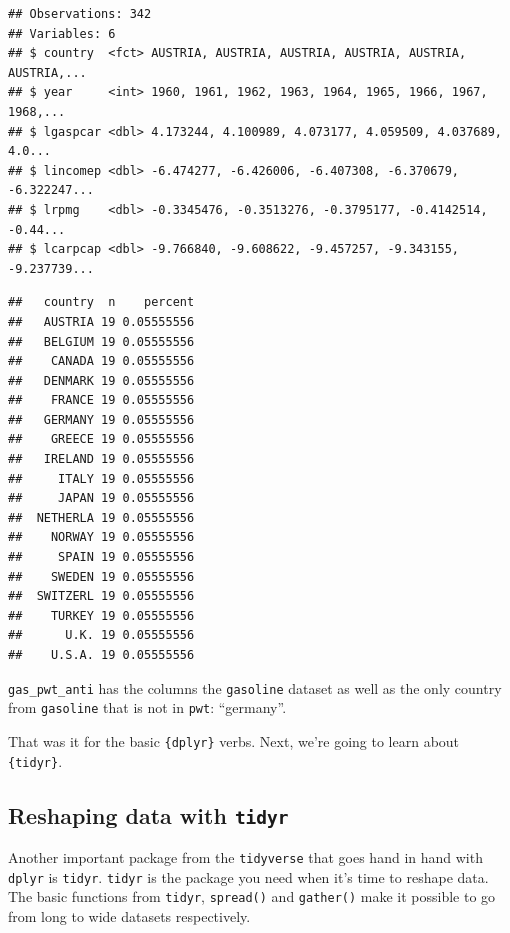 \documentclass[]{gitbook}
\newenvironment{Shaded}{\begin{snugshade}}{\end{snugshade}}
\newcommand{\KeywordTok}[1]{\textcolor[rgb]{0.13,0.29,0.53}{\textbf{#1}}}
\newcommand{\NormalTok}[1]{#1}
\newcommand{\OperatorTok}[1]{\textcolor[rgb]{0.81,0.36,0.00}{\textbf{#1}}}
\newcommand{\StringTok}[1]{\textcolor[rgb]{0.31,0.60,0.02}{#1}}
\theoremstyle{definition}
\theoremstyle{definition}
\theoremstyle{definition}
\theoremstyle{remark}
\begin{document}
\begin{verbatim}
## Observations: 342
## Variables: 6
## $ country  <fct> AUSTRIA, AUSTRIA, AUSTRIA, AUSTRIA, AUSTRIA, AUSTRIA,...
## $ year     <int> 1960, 1961, 1962, 1963, 1964, 1965, 1966, 1967, 1968,...
## $ lgaspcar <dbl> 4.173244, 4.100989, 4.073177, 4.059509, 4.037689, 4.0...
## $ lincomep <dbl> -6.474277, -6.426006, -6.407308, -6.370679, -6.322247...
## $ lrpmg    <dbl> -0.3345476, -0.3513276, -0.3795177, -0.4142514, -0.44...
## $ lcarpcap <dbl> -9.766840, -9.608622, -9.457257, -9.343155, -9.237739...
\end{verbatim}

\begin{Shaded}
\end{Shaded}

\begin{verbatim}
##   country  n    percent
##   AUSTRIA 19 0.05555556
##   BELGIUM 19 0.05555556
##    CANADA 19 0.05555556
##   DENMARK 19 0.05555556
##    FRANCE 19 0.05555556
##   GERMANY 19 0.05555556
##    GREECE 19 0.05555556
##   IRELAND 19 0.05555556
##     ITALY 19 0.05555556
##     JAPAN 19 0.05555556
##  NETHERLA 19 0.05555556
##    NORWAY 19 0.05555556
##     SPAIN 19 0.05555556
##    SWEDEN 19 0.05555556
##  SWITZERL 19 0.05555556
##    TURKEY 19 0.05555556
##      U.K. 19 0.05555556
##    U.S.A. 19 0.05555556
\end{verbatim}

\texttt{gas\_pwt\_anti} has the columns the \texttt{gasoline} dataset as
well as the only country from \texttt{gasoline} that is not in
\texttt{pwt}: ``germany''.

That was it for the basic \texttt{\{dplyr\}} verbs. Next, we're going to
learn about \texttt{\{tidyr\}}.

\hypertarget{reshaping-data-with-tidyr}{%
\subsection{\texorpdfstring{Reshaping data with
\texttt{tidyr}}{Reshaping data with tidyr}}\label{reshaping-data-with-tidyr}}

Another important package from the \texttt{tidyverse} that goes hand in
hand with \texttt{dplyr} is \texttt{tidyr}. \texttt{tidyr} is the
package you need when it's time to reshape data. The basic functions
from \texttt{tidyr}, \texttt{spread()} and \texttt{gather()} make it
possible to go from long to wide datasets respectively.
\end{document}
